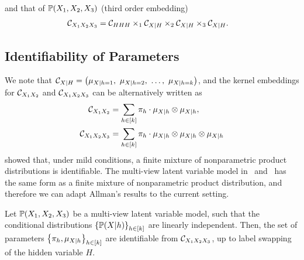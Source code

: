 \documentclass{article}
\begin{document}
and that of $\mathbb{P}(X_1,X_2,X_3)$ (third order embedding)
\begin{align}
  &\mathcal{C}_{X_1 X_2 X_3}
  = \mathcal{C}_{HHH} \times_1 \mathcal{C}_{X|H} \times_2 \mathcal{C}_{X|H} \times_3 \mathcal{C}_{X|H}. \label{eq:triple_factorization}
\end{align}

\vspace{-3mm}
\subsection{Identifiability of Parameters}
\vspace{-3mm}

We note that $\mathcal{C}_{X|H} = \left(\mu_{X|h=1},\ \mu_{X|h=2},\ \ldots,\ \mu_{X|h=k}\right)$, and the kernel embeddings for $\mathcal{C}_{X_1 X_2}$ and $\mathcal{C}_{X_1 X_2 X_3}$ can be alternatively written as
\begin{align}
	\mathcal{C}_{X_1 X_2}
  & = \sum_{h \in [k]} \pi_h\cdot \mu_{X|h} \otimes \mu_{X|h}, \label{eq:joint2} \\
  \mathcal{C}_{X_1 X_2 X_3}
  &= \sum_{h \in [k]} \pi_h\cdot \mu_{X|h} \otimes \mu_{X|h} \otimes \mu_{X|h} \label{eq:joint3}
\end{align}
\citet{AllMatRho09} showed that, under mild conditions, a finite mixture of nonparametric product distributions is identifiable. The multi-view latent variable model in~ and~ has the same form as a finite mixture of nonparametric product distribution, and therefore we can adapt Allman's results to the current setting.
\begin{proposition}[Identifiability]\label{prop:identifiability}
\vspace{-2mm}
  Let $\mathbb{P}(X_1,X_2,X_3)$ be a multi-view latent variable model, such that the conditional distributions $\left\{\mathbb{P}(X|h)\right\}_{h \in [k]}$ are linearly independent. Then, the set of parameters $\left\{\pi_h, \mu_{X|h}\right\}_{h \in [k]}$ are identifiable from $\mathcal{C}_{X_1 X_2 X_3}$, up to label swapping of the hidden variable $H$.
\vspace{-2mm}
\end{proposition}
\end{document}
